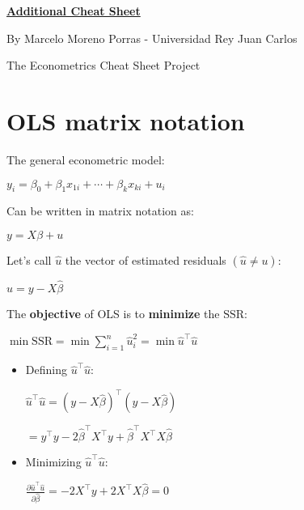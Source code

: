 \documentclass[10pt, a4paper, landscape]{article}
\newcommand{\SSR}{\text{SSR}}
\begin{document}
\begin{multicols}{3}

\begin{center}
	\textbf{\LARGE \href{https://github.com/marcelomijas/econometrics-cheatsheet}{Additional Cheat Sheet}}

	{\footnotesize By Marcelo Moreno Porras - Universidad Rey Juan Carlos}

	{\footnotesize The Econometrics Cheat Sheet Project}
\end{center}

\section*{OLS matrix notation}

The general econometric model:

\begin{center}
	\( y_{i} = \beta_{0} + \beta_{1} x_{1i} + \cdots + \beta_{k} x_{ki} + u_{i} \)
\end{center}

Can be written in matrix notation as:

\begin{center}
	\( y = X \beta + u \)
\end{center}

Let's call \( \hat{u} \) the vector of estimated residuals \( (\hat{u} \neq u) \):

\begin{center}
	\( \hat{u} = y - X \hat{\beta} \)
\end{center}

The \textbf{objective} of OLS is to \textbf{minimize} the \( \SSR \):

\begin{center}
	\( \min \SSR = \min \sum_{i = 1}^{n} \hat{u}_{i}^{2} = \min \hat{u}^{\top} \hat{u} \)
\end{center}

\begin{itemize}[leftmargin=*]
	\item Defining \( \hat{u}^{\top} \hat{u} \):
	\begin{center}
		\( \hat{u}^{\top} \hat{u} = (y - X \hat{\beta})^{\top} (y - X \hat{\beta}) \)

		\( = y^{\top} y - 2 \hat{\beta}^{\top} X^{\top} y + \hat{\beta}^{\top} X^{\top} X \hat{\beta} \)
	\end{center}
	\item Minimizing \( \hat{u}^{\top} \hat{u} \):
	\begin{center}
		\( \frac{\partial \hat{u}^{\top} \hat{u}}{\partial \hat{\beta}} = -2 X^{\top} y + 2 X^{\top} X \hat{\beta} = 0 \)


\end{center}
\end{itemize}
\end{multicols}
\end{document}
